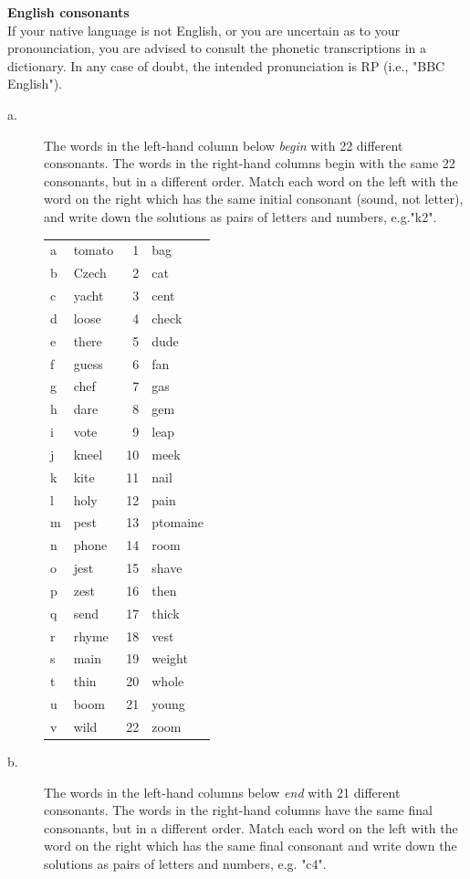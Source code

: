\documentclass[11pt]{article}
\begin{document}
\vspace*{0.5cm} %
\newpage

\begin{problem}{2}
\textbf{English consonants} \\
If your native language is not English, or you are uncertain as to your pronounciation, you are advised to
consult the phonetic transcriptions in a dictionary. In any case of doubt, the intended pronunciation is RP
(i.e., "BBC English"). 

\begin{description}
	\item[a.] The words in the left-hand column below \textit{begin} with 22 different consonants. The words in the right-hand columns begin with the same 22 consonants, but in a different order. Match each word on the left with the word on the right which has the same initial consonant (sound, not letter), and write down the solutions as pairs of letters and numbers, e.g."k2".

	\begin{tabular}{l p{6cm} | r l}
		a & tomato & 1 & bag \\
		b & Czech & 2 & cat \\
		c & yacht & 3 & cent \\
		d & loose & 4 & check \\
		e & there & 5 & dude \\
		f & guess & 6 & fan \\
		g & chef & 7 & gas \\
		h & dare & 8 & gem \\
		i & vote & 9 & leap \\
		j & kneel & 10 & meek \\
		k & kite & 11 & nail \\
		l & holy & 12 & pain \\
		m & pest & 13 & ptomaine \\
		n & phone & 14 & room \\
		o & jest & 15 & shave \\
		p & zest & 16 & then \\
		q & send & 17 & thick \\
		r & rhyme & 18 & vest \\
		s & main & 19 & weight \\
		t & thin & 20 & whole \\
		u & boom & 21 & young \\
		v & wild & 22 & zoom 
	\end{tabular}
	\newpage
	\item[b.] The words in the left-hand columns below \textit{end} with 21 different consonants. The words in the right-hand columns have the same final consonants, but in a different order. Match each word on the left with the word on the right which has the same final consonant and write down the solutions as pairs of letters and numbers, e.g. "c4".
	

\end{description}
\end{problem}
\end{document}
